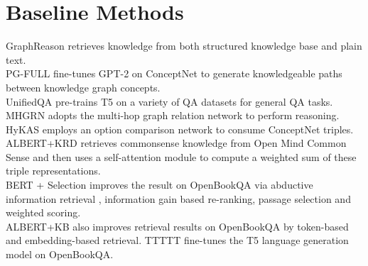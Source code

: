 \documentclass[11pt,a4paper]{article}
\begin{document}
\section{Baseline Methods}
 GraphReason \citep{lv2020graph} retrieves knowledge from both structured knowledge base and plain text. \\ 
 PG-FULL \citep{wang2020connecting} fine-tunes GPT-2 on ConceptNet to generate knowledgeable paths between knowledge graph concepts. \\
UnifiedQA \citep{unifiedqa} pre-trains T5 on a variety of QA datasets for general QA tasks.\\
MHGRN \citep{feng2020scalable} adopts the multi-hop graph relation network to perform reasoning.\\ HyKAS \citep{ma2019towards} employs an option comparison network to consume ConceptNet triples.\\
ALBERT+KRD retrieves commonsense knowledge from Open Mind Common Sense and then uses a self-attention module to compute a weighted sum of these triple representations. \\
BERT + Selection \cite{Banerjee2019CarefulSO} improves the result on OpenBookQA via abductive information retrieval , information gain based re-ranking, passage selection and weighted scoring. \\ 
ALBERT+KB also improves retrieval results on OpenBookQA by token-based and embedding-based retrieval.
TTTTT \citep{t5} fine-tunes the T5 language generation model on OpenBookQA.
\end{document}
